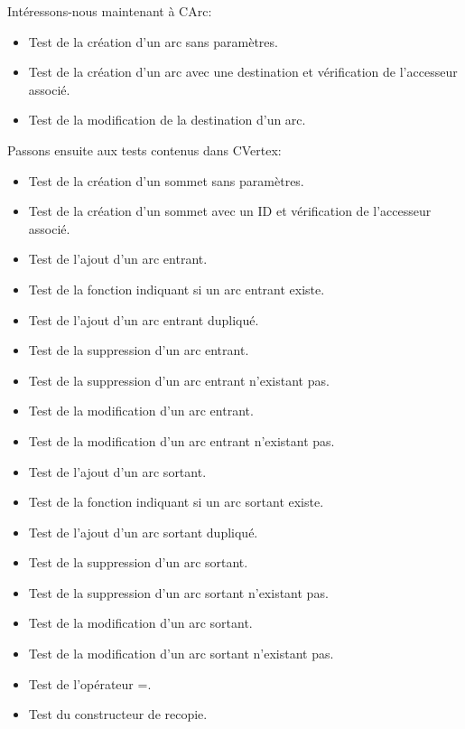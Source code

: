 		Intéressons-nous maintenant à CArc:
		\begin{itemize}
			\item Test de la création d'un arc sans paramètres.
			\item Test de la création d'un arc avec une destination et vérification de l'accesseur associé.
			\item Test de la modification de la destination d'un arc.
		\end{itemize}
		
		Passons ensuite aux tests contenus dans CVertex:
		\begin{itemize}
			\item Test de la création d'un sommet sans paramètres.
			\item Test de la création d'un sommet avec un ID et vérification de l'accesseur associé.
			\item Test de l'ajout d'un arc entrant.
			\item Test de la fonction indiquant si un arc entrant existe.
			\item Test de l'ajout d'un arc entrant dupliqué.
			\item Test de la suppression d'un arc entrant.
			\item Test de la suppression d'un arc entrant n'existant pas.
			\item Test de la modification d'un arc entrant.
			\item Test de la modification d'un arc entrant n'existant pas.
			\item Test de l'ajout d'un arc sortant.
			\item Test de la fonction indiquant si un arc sortant existe.
			\item Test de l'ajout d'un arc sortant dupliqué.
			\item Test de la suppression d'un arc sortant.
			\item Test de la suppression d'un arc sortant n'existant pas.
			\item Test de la modification d'un arc sortant.
			\item Test de la modification d'un arc sortant n'existant pas.
			\item Test de l'opérateur =.
			\item Test du constructeur de recopie.
		\end{itemize}
		
